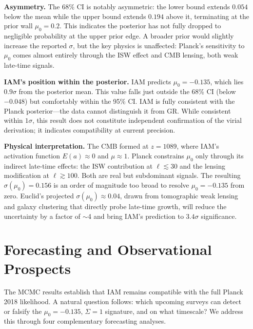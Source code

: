 \documentclass[11pt,letterpaper]{article}
\begin{document}
\noindent\textbf{Asymmetry.} The 68\% CI is notably asymmetric: the lower bound extends $0.054$ below the mean while the upper bound extends $0.194$ above it, terminating at the prior wall $\mu_0 = 0.2$. This indicates the posterior has not fully dropped to negligible probability at the upper prior edge. A broader prior would slightly increase the reported $\sigma$, but the key physics is unaffected: Planck's sensitivity to $\mu_0$ comes almost entirely through the ISW effect and CMB lensing, both weak late-time signals.

\noindent\textbf{IAM's position within the posterior.} IAM predicts $\mu_0 = -0.135$, which lies $0.9\sigma$ from the posterior mean. This value falls just outside the 68\% CI (below $-0.048$) but comfortably within the 95\% CI. IAM is fully consistent with the Planck posterior---the data cannot distinguish it from GR. While consistent within $1\sigma$, this result does not constitute independent confirmation of the virial derivation; it indicates compatibility at current precision.

\noindent\textbf{Physical interpretation.} The CMB formed at $z = 1089$, where IAM's activation function $E(a) \approx 0$ and $\mu \approx 1$. Planck constrains $\mu_0$ only through its indirect late-time effects: the ISW contribution at $\ell \lesssim 30$ and the lensing modification at $\ell \gtrsim 100$. Both are real but subdominant signals. The resulting $\sigma(\mu_0) = 0.156$ is an order of magnitude too broad to resolve $\mu_0 = -0.135$ from zero. Euclid's projected $\sigma(\mu_0) \approx 0.04$, drawn from tomographic weak lensing and galaxy clustering that directly probe late-time growth, will reduce the uncertainty by a factor of $\sim$4 and bring IAM's prediction to $3.4\sigma$ significance.

\section{Forecasting and Observational Prospects}
\label{sec:forecasts}

The MCMC results establish that IAM remains compatible with the full Planck 2018 likelihood. A natural question follows: which upcoming surveys can detect or falsify the $\mu_0 = -0.135$, $\Sigma = 1$ signature, and on what timescale? We address this through four complementary forecasting analyses.
\end{document}
